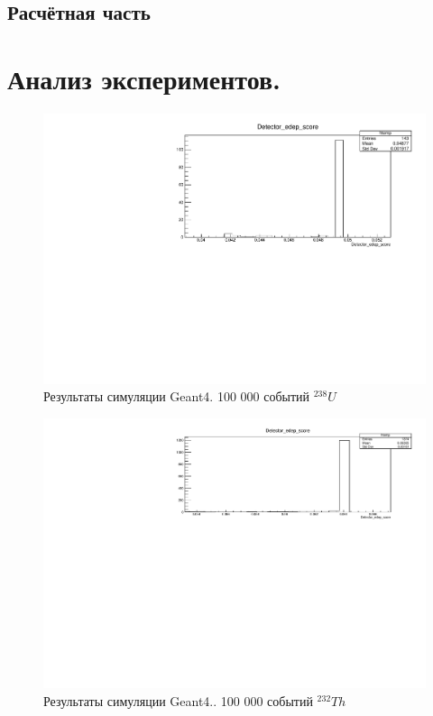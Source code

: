 \documentclass[a4paper,article,14pt]{extarticle}
\begin{document}
\subsection{Расчётная часть}

\section{Анализ экспериментов.}
\begin{figure}[ht]
\begin{center}
   \includegraphics[width = \textwidth]{images/238_U_100000events.pdf}
\caption{
\label{graph-fig}
     Результаты симуляции Geant4. 100 000 событий $^{238}U$}
\end {center}
\end {figure}

\begin{figure}[ht]
\begin{center}
   \includegraphics[width = \textwidth]{images/232_Th_100000events.pdf}

\caption{
\label{graph-fig}
     Результаты симуляции Geant4.. 100 000 событий $^{232}Th$}
\end {center}
\end {figure}
\end{document}
